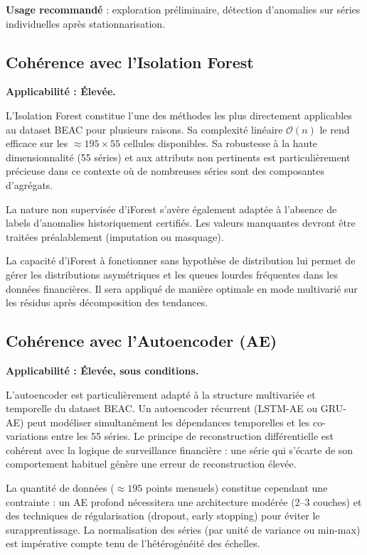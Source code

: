 \documentclass[12pt, a4paper]{article}
\begin{document}
\textbf{Usage recommandé} : exploration préliminaire, détection d'anomalies
sur séries individuelles après stationnarisation.

\subsection{Cohérence avec l'Isolation Forest}

\textbf{Applicabilité : Élevée.}

L'Isolation Forest constitue l'une des méthodes les plus directement
applicables au dataset BEAC pour plusieurs raisons. Sa complexité
linéaire $\mathcal{O}(n)$ le rend efficace sur les $\approx 195 \times 55$
cellules disponibles. Sa robustesse à la haute dimensionnalité (55 séries)
et aux attributs non pertinents est particulièrement précieuse dans ce
contexte où de nombreuses séries sont des composantes d'agrégats.

La nature non supervisée d'iForest s'avère également adaptée à l'absence
de labels d'anomalies historiquement certifiés. Les valeurs manquantes
devront être traitées préalablement (imputation ou masquage).

La capacité d'iForest à fonctionner sans hypothèse de distribution
lui permet de gérer les distributions asymétriques et les queues lourdes
fréquentes dans les données financières. Il sera appliqué de manière
optimale en mode multivarié sur les résidus après décomposition des
tendances.

\subsection{Cohérence avec l'Autoencoder (AE)}

\textbf{Applicabilité : Élevée, sous conditions.}

L'autoencoder est particulièrement adapté à la structure multivariée
et temporelle du dataset BEAC. Un autoencoder récurrent (LSTM-AE ou
GRU-AE) peut modéliser simultanément les dépendances temporelles et
les co-variations entre les 55 séries. Le principe de reconstruction
différentielle est cohérent avec la logique de surveillance financière :
une série qui s'écarte de son comportement habituel génère une erreur
de reconstruction élevée.

La quantité de données ($\approx 195$ points mensuels) constitue
cependant une contrainte : un AE profond nécessitera une architecture
modérée (2--3 couches) et des techniques de régularisation (dropout,
early stopping) pour éviter le surapprentissage. La normalisation des
séries (par unité de variance ou min-max) est impérative compte tenu
de l'hétérogénéité des échelles.
\end{document}
